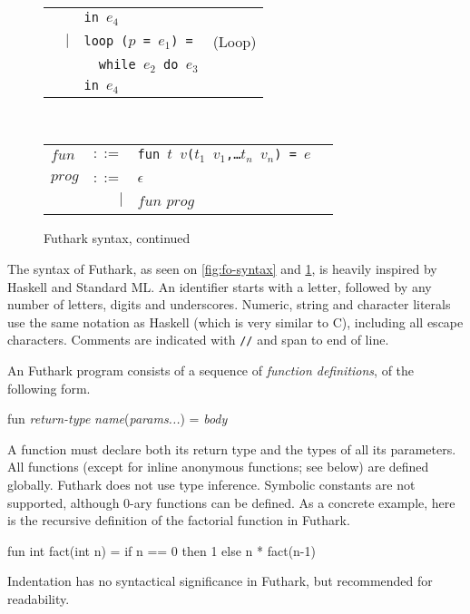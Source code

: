 \documentclass[oneside]{memoir}
\begin{document}
\begin{figure}[bt]
\begin{tabular}{lrll}
&     & \texttt{in $e_{4}$} \\
& $|$ & \texttt{loop ($p$ = $e_{1}$) =} & (Loop) \\
&     & \texttt{\ \ while $e_{2}$ do $e_{3}$} \\
&     & \texttt{in $e_{4}$} \\
\end{tabular}
\\
\begin{tabular}{lrll}
$fun$ & $::=$ & \texttt{fun $t$ $v$($t_{1}$ $v_{1}$,\ldots $t_{n}$ $v_{n}$) = $e$} \\
\\
$prog$ & $::=$ & $\epsilon$ \\
       & $|$   & $fun$ $prog$
\end{tabular}
\caption{Futhark syntax, continued}
\label{fig:fo-syntax-continued}
\end{figure}

The syntax of Futhark, as seen on \cref{fig:fo-syntax} and
\cref{fig:fo-syntax-continued}, is heavily inspired by Haskell and
Standard ML.  An identifier starts with a letter, followed by any
number of letters, digits and underscores.  Numeric, string and
character literals use the same notation as Haskell (which is very
similar to C), including all escape characters.  Comments are
indicated with \texttt{//} and span to end of line.

An Futhark program consists of a sequence of \emph{function
  definitions}, of the following form.

\begin{colorcode}
  fun \textit{return-type} \textit{name}(\textit{params...}) = \textit{body}
\end{colorcode}

A function must declare both its return type and the types of all its
parameters.  All functions (except for inline anonymous functions; see
below) are defined globally.  Futhark does not use type inference.
Symbolic constants are not supported, although 0-ary functions can be
defined.  As a concrete example, here is the recursive definition of
the factorial function in Futhark.
\begin{colorcode}
  fun int fact(int n) =
    if n == 0 then 1
              else n * fact(n-1)
\end{colorcode}
Indentation has no syntactical significance in Futhark, but recommended for
readability.
\end{document}
